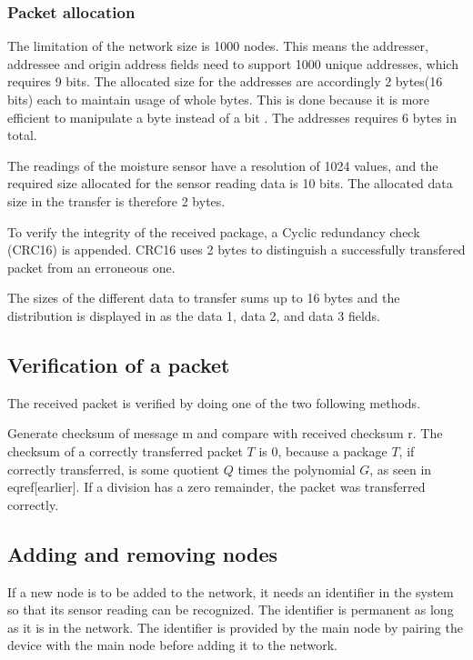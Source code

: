 \subsubsection{Packet allocation}
The limitation of the network size is 1000 nodes. This means the addresser, addressee and origin address fields need to support 1000 unique addresses, which requires 9 bits. The allocated size for the addresses are accordingly 2 bytes(16 bits) each to maintain usage of whole bytes. This is done because it is more efficient to manipulate a byte instead of a bit \cite{bytevsbit}. The addresses requires 6 bytes in total.

The readings of the moisture sensor have a resolution of 1024 values, and the required size allocated for the sensor reading data is 10 bits. The allocated data size in the transfer is therefore 2 bytes.

To verify the integrity of the received package, a Cyclic redundancy check (CRC16) is appended. CRC16 uses 2 bytes to distinguish a successfully transfered packet from an erroneous one. 

The sizes of the different data to transfer sums up to 16 bytes and the distribution is displayed in  as the data 1, data 2, and data 3 fields.




\subsection{Verification of a packet}
The received packet is verified by doing one of the two following methods. 

Generate checksum of message m and compare with received checksum r.
The checksum of a correctly transferred packet $T$ is 0, because a package $T$, if correctly transferred, is some quotient $Q$ times the polynomial $G$, as seen in eqref[earlier]. If a division has a zero remainder, the packet was transferred correctly.




\subsection{Adding and removing nodes}
If a new node is to be added to the network, it needs an identifier in the system so that its sensor reading can be recognized. The identifier is permanent as long as it is in the network.
The identifier is provided by the main node by pairing the device with the main node before adding it to the network. 

